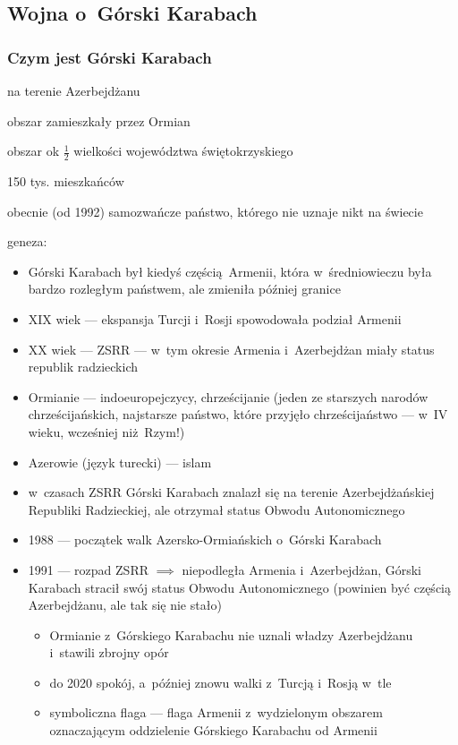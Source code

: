 \subsection*{Wojna o~Górski Karabach}
\subsubsection*{Czym jest Górski Karabach}
\begin{description}
    \item na terenie Azerbejdżanu
    \item obszar zamieszkały przez Ormian
    \item obszar ok \(\frac{1}{2}\) wielkości województwa świętokrzyskiego
    \item 150 tys. mieszkańców
    \item obecnie (od 1992) samozwańcze państwo, którego nie uznaje nikt na świecie
    \item geneza:
        \begin{itemize}
            \item Górski Karabach był kiedyś częścią Armenii, która w~średniowieczu była bardzo rozległym państwem, ale zmieniła później granice
            \item XIX wiek --- ekspansja Turcji i~Rosji spowodowała podział Armenii
            \item XX wiek --- ZSRR --- w~tym okresie Armenia i~Azerbejdżan miały status republik radzieckich
            \item Ormianie --- indoeuropejczycy, chrześcijanie (jeden ze starszych narodów chrześcijańskich, najstarsze państwo, które przyjęło chrześcijaństwo --- w~IV wieku, wcześniej niż Rzym!)
            \item Azerowie (język turecki) --- islam
            \item w~czasach ZSRR Górski Karabach znalazł się na terenie Azerbejdżańskiej Republiki Radzieckiej, ale otrzymał status Obwodu Autonomicznego
            \item 1988 --- początek walk Azersko-Ormiańskich o~Górski Karabach
            \item 1991 --- rozpad ZSRR \(\implies\) niepodległa Armenia i~Azerbejdżan, Górski Karabach stracił swój status Obwodu Autonomicznego (powinien być częścią Azerbejdżanu, ale tak się nie stało)
                \begin{itemize}
                    \item Ormianie z~Górskiego Karabachu nie uznali władzy Azerbejdżanu i~stawili zbrojny opór
                    \item do 2020 spokój, a~później znowu walki z~Turcją i~Rosją w~tle
                    \item symboliczna flaga --- flaga Armenii z~wydzielonym obszarem oznaczającym oddzielenie Górskiego Karabachu od Armenii
                \end{itemize}
        \end{itemize}
\end{description}